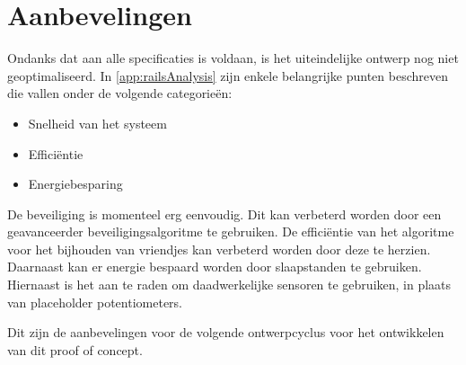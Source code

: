 \section{Aanbevelingen} \label{sec:aanbevelingen}


Ondanks dat aan alle specificaties is voldaan, is het uiteindelijke ontwerp nog niet geoptimaliseerd. In \autoref{app:railsAnalysis} zijn enkele belangrijke punten beschreven die vallen onder de volgende categorieën:
\begin{itemize}
\item Snelheid van het systeem
\item Efficiëntie
\item Energiebesparing
\end{itemize}
De beveiliging is momenteel erg eenvoudig. Dit kan verbeterd worden door een geavanceerder beveiligingsalgoritme te gebruiken. De efficiëntie van het algoritme voor het bijhouden van vriendjes kan verbeterd worden door deze te herzien. Daarnaast kan er energie bespaard worden door slaapstanden te gebruiken. Hiernaast is het aan te raden om daadwerkelijke sensoren te gebruiken, in plaats van placeholder potentiometers.

Dit zijn de aanbevelingen voor de volgende ontwerpcyclus voor het ontwikkelen van dit proof of concept.